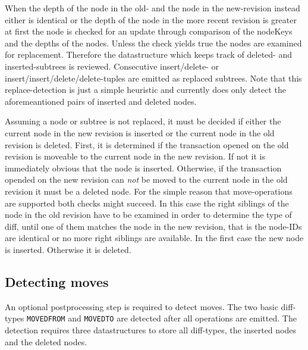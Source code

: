 When the depth of the node in the old- and the node in the new-revision instead either is identical or the depth of the node in the more recent revision is greater at first the node is checked for an update through comparison of the nodeKeys and the depths of the nodes. Unless the check yields true the nodes are examined for replacement. Therefore the datastructure which keeps track of deleted- and inserted-subtrees is reviewed. Consecutive insert/delete- or insert/insert/delete/delete-tuples are emitted as replaced subtrees. Note that this replace-detection is just a simple heuristic and currently does only detect the aforemeantioned pairs of inserted and deleted nodes.%

Assuming a node or subtree is not replaced, it must be decided if either the current node in the new revision is inserted or the current node in the old revision is deleted. First, it is determined if the transaction opened on the old revision is moveable to the current node in the new revision. If not it is immediately obvious that the node is inserted. Otherwise, if the transaction opended on the new revision can \emph{not} be moved to the current node in the old revision it must be a deleted node. For the simple reason that move-operations are supported both checks might succeed. In this case the right siblings of the node in the old revision have to be examined in order to determine the type of diff, until one of them matches the node in the new revision, that is the node-IDs are identical or no more right siblings are available. In the first case the new node is inserted. Otherwise it is deleted.

\subsection{Detecting moves}
An optional postprocessing step is required to detect moves. The two basic diff-types \texttt{MOVEDFROM} and \texttt{MOVEDTO} are detected after all operations are emitted. The detection requires three datastructures to store all diff-types, the inserted nodes and the deleted nodes.

